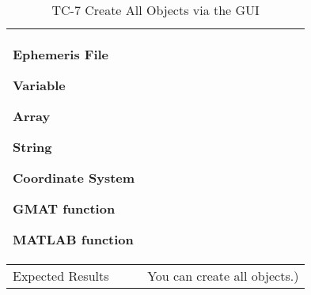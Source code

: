 \begin{table}[htbp!]
\begin{tabular}{|p{1.05 in} |p{4.75 in} |}
\begin{compactenum}
             \item Ephemeris File
             \item Variable
             \item Array
             \item String
             \item Coordinate System
             \item GMAT function
             \item MATLAB function
         \end{compactenum}
         \\ \hline
         Expected Results & You can create all objects.)\\
      \hline
      \end{tabular}
      \label{Table:TC-7}
      \caption{TC-7 Create All Objects via the GUI}
\end{table} 